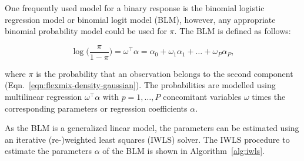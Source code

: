 \documentclass[article,nojss,shortnames]{jss}
\begin{document}
One frequently used model for a binary response is the binomial logistic regression
model or binomial logit model (BLM), however, any appropriate binomial probability
model could be used for $\pi$.
The BLM is defined as follows:

\begin{equation}
    \log\Big(\frac{\pi}{1 - \pi}\Big) =
        \omega^\top \alpha = \alpha_0 + \omega_1 \alpha_1 + \dots + \omega_P \alpha_P,
\end{equation}

where $\mathit{\pi}$ is the probability that an observation belongs to the
second component (Eqn.~\ref{eqn:flexmix-density-gaussian}).
The probabilities are modelled using multilinear regression
$\mathit{\omega}^\top \mathit{\alpha}$ with $p=1,\dots,P$ concomitant
variables $\mathit{\omega}$ times the corresponding parameters or regression
coefficients $\mathit{\alpha}$.

As the BLM is a generalized linear model, the parameters can be estimated using
an iterative (re-)weighted least squares (IWLS) solver.
The IWLS procedure to estimate the parameters $\mathit{\alpha}$ of the BLM
is shown in Algorithm~\ref{alg:iwls}.
\end{document}
